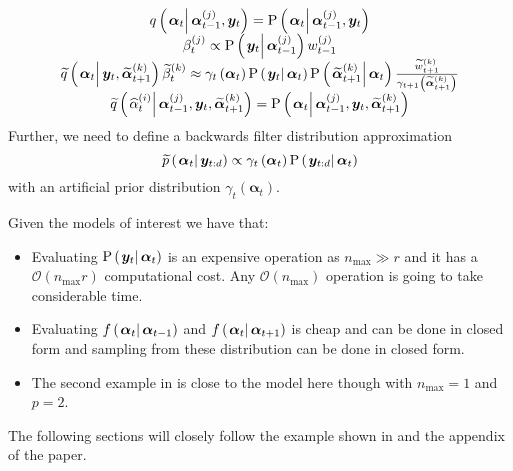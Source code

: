 \documentclass[9pt, notitlepage]{article}
\renewcommand{\vec}[1]{\bm{#1}}
\newcommand{\Lparen}[1]{\left( #1\right)}
\newcommand{\Cond}[2]{\left. #1 \vphantom{#2} \right\vert  #2}
\newcommand{\Prob}{\text{P}}
\newcommand{\optor}[2]{#1\Lparen{#2}}
\newcommand{\optorC}[3]{\optor{#1}{\Cond{#2}{#3}}}
\newcommand{\propC}[2]{\optorC{\Prob}{#1}{#2}}
\newcommand{\propAproxC}[2]{\optorC{\widetilde{p}}{#1}{#2}}
\newcommand{\IDC}[2]{\optorC{q}{#1}{#2}}
\newcommand{\IDAproxC}[2]{\optorC{\widetilde{q}}{#1}{#2}}
\newcommand{\partic}[3]{#1_{#2}^{\Lparen{#3}}}
\newcommand{\particB}[3]{\widetilde{#1}_{#2}^{\Lparen{#3}}}
\newcommand{\particS}[3]{\widehat{#1}_{#2}^{\Lparen{#3}}}
\newcommand{\bigO}[1]{\mathcal{O}\Lparen{#1}}
\newcommand{\dimState}{p}
\newcommand{\dimRng}{r}
\newcommand{\nPeriods}{d}
\newcommand{\nMax}{n_{\text{max}}}
\begin{document}
\begin{equation}\begin{matrix}
	\IDC{\vec{\alpha}_t}{\partic{\vec{\alpha}}{t-1}{j}, \vec{y}_t} = \propC{\vec{\alpha}_t}{\partic{\vec{\alpha}}{t-1}{j}, \vec{y}_t} \\
	\partic{\beta}{t}{j} \propto \propC{\vec{y}_t}{\partic{\vec{\alpha}}{t-1}{j}}\partic{w}{t-1}{j} \\
%
	\IDAproxC{\vec{\alpha}_t}{\vec{y}_t, \particB{\vec{\alpha}}{t + 1}{k}}\particB{\beta}{t}{k} \approx %
		\gamma_t\Lparen{\vec{\alpha}_t}
		\propC{\vec{y}_t}{\vec{\alpha}_t}
		\propC{\particB{\vec{\alpha}}{t + 1}{k}}{\vec{\alpha}_t}
		\frac{\particB{w}{t + 1}{k}}{\gamma_{t + 1}\Lparen{\particB{\vec{\alpha}}{t + 1}{k}}} \\
%
	\IDAproxC{\particS{\alpha}{t}{i}}{\partic{\vec{\alpha}}{t-1}{j},\vec{y}_t, \particB{\vec{\alpha}}{t+1}{k}} =
		\propC{\vec{\alpha}_t}{\partic{\vec{\alpha}}{t-1}{j},\vec{y}_t, \particB{\vec{\alpha}}{t+1}{k}}
\end{matrix}\end{equation}%
%
Further, we need to define a backwards filter distribution approximation%
%
\begin{equation}
	\propAproxC{\vec{\alpha}_t}{\vec{y}_{t:\nPeriods}} \propto \gamma_t \Lparen{\vec{\alpha}_t}\propC{\vec{y}_{t:\nPeriods}}{\vec{\alpha}_t}
\end{equation}%
%
with an artificial prior distribution $\gamma_t \Lparen{\vec{\alpha}_t}$.

Given the models of interest we have that:

\begin{itemize}
	\item Evaluating $\propC{\vec{y}_t}{\vec{\alpha}_t}$ is an expensive operation as $\nMax \gg \dimRng$ and it has a $\bigO{\nMax\dimRng}$ computational cost. Any $\bigO{\nMax}$ operation is going to take considerable time.
	\item Evaluating $\optorC{f}{\vec{\alpha}_t}{\vec{\alpha}_{t -1}}$ and $\optorC{f}{\vec{\alpha}_t}{\vec{\alpha}_{t + 1}}$ is cheap and can be done in closed form and sampling from these distribution can be done in closed form.
	\item The second example in \cite{fearnhead10} is close to the model here though with $\nMax = 1$ and $\dimState = 2$.
\end{itemize}

The following sections will closely follow the example shown in \cite{fearnhead10} and the appendix of the paper.
\end{document}
